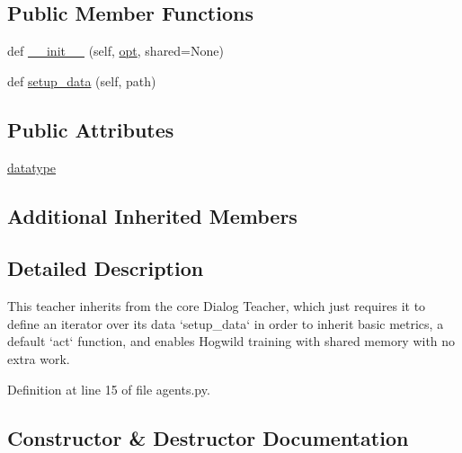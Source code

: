\subsection*{Public Member Functions}
\begin{DoxyCompactItemize}
\item 
def \hyperlink{classparlai_1_1tasks_1_1ubuntu_1_1agents_1_1UbuntuTeacher_aa5a556a3369c3b20101179c6e3f63c2a}{\+\_\+\+\_\+init\+\_\+\+\_\+} (self, \hyperlink{classparlai_1_1core_1_1agents_1_1Teacher_a3ce6243860ce978a897922863ed32fa4}{opt}, shared=None)
\item 
def \hyperlink{classparlai_1_1tasks_1_1ubuntu_1_1agents_1_1UbuntuTeacher_ac8386ce4d46f4d3e8b296ac291ff4997}{setup\+\_\+data} (self, path)
\end{DoxyCompactItemize}
\subsection*{Public Attributes}
\begin{DoxyCompactItemize}
\item 
\hyperlink{classparlai_1_1tasks_1_1ubuntu_1_1agents_1_1UbuntuTeacher_ae664115e7a564e2a816adc8ecc6ea831}{datatype}
\end{DoxyCompactItemize}
\subsection*{Additional Inherited Members}


\subsection{Detailed Description}
\begin{DoxyVerb}This teacher inherits from the core Dialog Teacher, which just requires it to define
an iterator over its data `setup_data` in order to inherit basic metrics, a default
`act` function, and enables Hogwild training with shared memory with no extra work.
\end{DoxyVerb}
 

Definition at line 15 of file agents.\+py.



\subsection{Constructor \& Destructor Documentation}
\mbox{\label{classparlai_1_1tasks_1_1ubuntu_1_1agents_1_1UbuntuTeacher_aa5a556a3369c3b20101179c6e3f63c2a}} 
